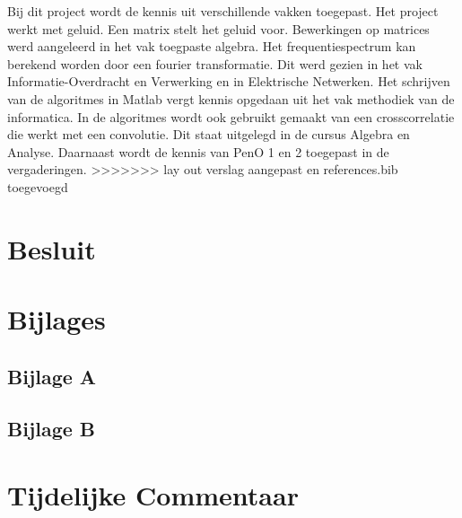 \documentclass[12pt]{report}
\begin{document}
Bij dit project wordt de kennis uit verschillende vakken toegepast. Het project werkt met geluid. Een matrix stelt het geluid voor. Bewerkingen op matrices werd aangeleerd in het vak toegpaste algebra. Het frequentiespectrum kan berekend worden door een fourier transformatie. Dit werd gezien in het vak Informatie-Overdracht en Verwerking en in Elektrische Netwerken. Het schrijven van de algoritmes in Matlab vergt kennis opgedaan uit het vak methodiek van de informatica. In de algoritmes wordt ook gebruikt gemaakt van een crosscorrelatie die werkt met een convolutie. Dit staat uitgelegd in de cursus Algebra en Analyse. Daarnaast wordt de kennis van PenO 1 en 2 toegepast in de vergaderingen. 
>>>>>>> lay out verslag aangepast en references.bib toegevoegd

\chapter{Besluit}







\chapter{Bijlages}
\section{Bijlage A}
\label{sec:bijlageA}

\section{Bijlage B}





\chapter{Tijdelijke Commentaar}
\end{document}
